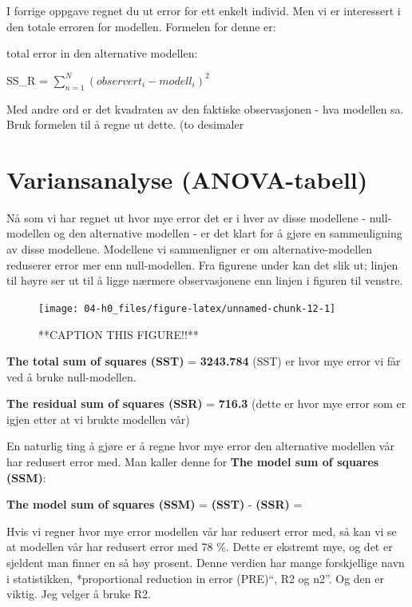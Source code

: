 \documentclass[
]{book}
\begin{document}
I forrige oppgave regnet du ut error for ett enkelt individ. Men vi er interessert i den totale erroren for modellen. Formelen for denne er:

total error in den alternative modellen:

SS\_R = \(\sum_{n=1}^N (observert_i - modell_i)^2\)

Med andre ord er det kvadraten av den faktiske observasjonen - hva modellen sa. Bruk formelen til å regne ut dette. (to desimaler

\hypertarget{variansanalyse-anova-tabell}{%
\section{Variansanalyse (ANOVA-tabell)}\label{variansanalyse-anova-tabell}}

Nå som vi har regnet ut hvor mye error det er i hver av disse modellene - null-modellen og den alternative modellen - er det klart for å gjøre en sammenligning av disse modellene. Modellene vi sammenligner er om alternative-modellen reduserer error mer enn null-modellen. Fra figurene under kan det slik ut; linjen til høyre ser ut til å ligge nærmere observasjonene enn linjen i figuren til venstre.

\begin{figure}

{\centering \texttt{[image: 04-h0\_files/figure-latex/unnamed-chunk-12-1]} 

}

\caption{**CAPTION THIS FIGURE!!**}\label{fig:unnamed-chunk-12}
\end{figure}

\textbf{The total sum of squares (SST)} = \textbf{3243.784}
(SST) er hvor mye error vi får ved å bruke null-modellen.

\textbf{The residual sum of squares (SSR)} = \textbf{716.3}
(dette er hvor mye error som er igjen etter at vi brukte modellen vår)

En naturlig ting å gjøre er å regne hvor mye error den alternative modellen vår har redusert error med. Man kaller denne for \textbf{The model sum of squares (SSM)}:

\textbf{The model sum of squares (SSM)} = \textbf{(SST)} - \textbf{(SSR)} =

Hvis vi regner hvor mye error modellen vår har redusert error med, så kan vi se at modellen vår har redusert error med 78 \%. Dette er ekstremt mye, og det er sjeldent man finner en så høy prosent. Denne verdien har mange forskjellige navn i statistikken, *proportional reduction in error (PRE)``, R2 og n2''. Og den er viktig. Jeg velger å bruke R2.
\end{document}
